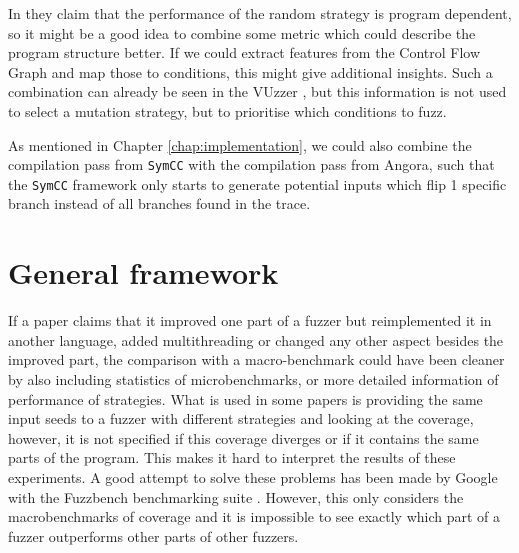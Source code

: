 In \cite{lyu2019mopt} they claim that the performance of the random strategy is program dependent, so it might be a good idea to combine some metric which could describe the program structure better. If we could extract features from the Control Flow Graph and map those to conditions, this might give additional insights. Such a combination can already be seen in the VUzzer \cite{rawat2017vuzzer}, but this information is not used to select a mutation strategy, but to prioritise which conditions to fuzz.

As mentioned in Chapter \ref{chap:implementation}, we could also combine the compilation pass from \texttt{SymCC} with the compilation pass from Angora, such that the \texttt{SymCC} framework only starts to generate potential inputs which flip 1 specific branch instead of all branches found in the trace.


\section{General framework}
If a paper claims that it improved one part of a fuzzer but reimplemented it in another language, added multithreading or changed any other aspect besides the improved part, the comparison with a macro-benchmark could have been cleaner by also including statistics of microbenchmarks, or more detailed information of performance of strategies. What is used in some papers is providing the same input seeds to a fuzzer with different strategies and looking at the coverage, however, it is not specified if this coverage diverges or if it contains the same parts of the program. This makes it hard to interpret the results of these experiments. A good attempt to solve these problems has been made by Google with the Fuzzbench benchmarking suite \cite{metzman2020fuzzbench}. However, this only considers the macrobenchmarks of coverage and it is impossible to see exactly which part of a fuzzer outperforms other parts of other fuzzers.

